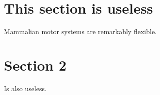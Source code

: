 \documentclass[a4paper]{article}
\begin{document}
\maketitle

\section{This section is useless}

Mammalian motor systems are remarkably flexible.

\section{Section 2}

Is also useless.

% 
% 
\end{document}
